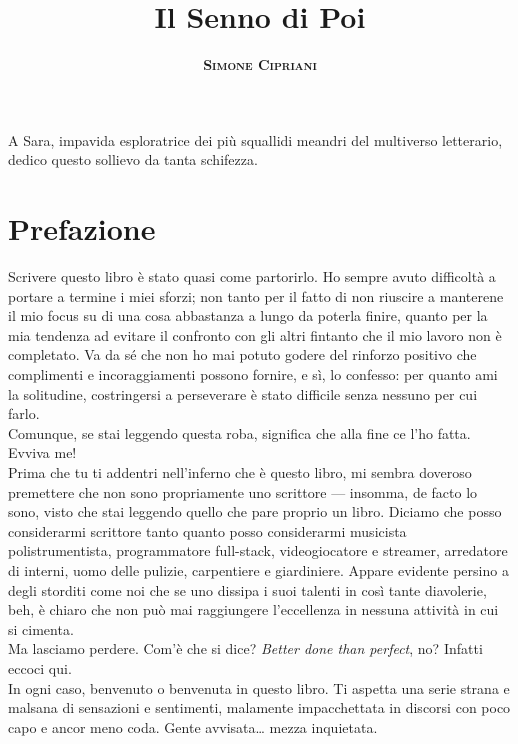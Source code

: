 \documentclass[12pt]{book}
\title{
	\Huge \textbf{Il Senno di Poi}
}
\author{
	\textsc{\textbf{Simone Cipriani}}
}
\newenvironment{dedication} {
	\cleardoublepage\thispagestyle{empty}
	\vspace*{\stretch{1}}
	\hfill\begin{minipage}[t]{0.66\textwidth}
	\raggedright}
{
	\end{minipage}
	\vspace*{\stretch{3}}
	\clearpage
}
\begin{document}
\setlength{\parskip}{0.25em}
\setlength{\parindent}{0.5em}

\frontmatter
\maketitle
\begin{dedication}
	A Sara, impavida esploratrice dei più squallidi meandri del multiverso letterario, dedico questo sollievo da tanta schifezza.
\end{dedication}

\mainmatter\chapter*{Prefazione}

Scrivere questo libro è stato quasi come partorirlo. Ho sempre avuto difficoltà a portare a termine i miei sforzi; non tanto per il fatto di non riuscire a manterene il mio focus su di una cosa abbastanza a lungo da poterla finire, quanto per la mia tendenza ad evitare il confronto con gli altri fintanto che il mio lavoro non è completato. Va da sé che non ho mai potuto godere del rinforzo positivo che complimenti e incoraggiamenti possono fornire, e sì, lo confesso: per quanto ami la solitudine, costringersi a perseverare è stato difficile senza nessuno per cui farlo. \\

Comunque, se stai leggendo questa roba, significa che alla fine ce l'ho fatta. Evviva me! \\

Prima che tu ti addentri nell'inferno che è questo libro, mi sembra doveroso premettere che non sono propriamente uno scrittore --- insomma, de facto lo sono, visto che stai leggendo quello che pare proprio un libro. Diciamo che posso considerarmi scrittore tanto quanto posso considerarmi musicista polistrumentista, programmatore full-stack, videogiocatore e streamer, arredatore di interni, uomo delle pulizie, carpentiere e giardiniere. Appare evidente persino a degli storditi come noi che se uno dissipa i suoi talenti in così tante diavolerie, beh, è chiaro che non può mai raggiungere l'eccellenza in nessuna attività in cui si cimenta. \\

Ma lasciamo perdere. Com'è che si dice? \emph{Better done than perfect}, no? Infatti eccoci qui. \\

In ogni caso, benvenuto o benvenuta in questo libro. Ti aspetta una serie strana e malsana di sensazioni e sentimenti, malamente impacchettata in discorsi con poco capo e ancor meno coda. Gente avvisata\ldots{} mezza inquietata.
\end{document}
